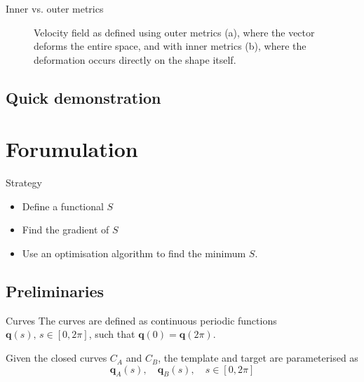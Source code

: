 \documentclass{beamer}
\newcommand{\vect}[1]{\ensuremath{\mathbf{#1}}}
\begin{document}
\begin{frame}{Inner vs. outer metrics}
\begin{figure}[h!]
  \centering
  \caption{Velocity field as defined using outer metrics
    (a), where the vector deforms the entire space, and with inner metrics (b), where the
    deformation occurs directly on the shape itself.}
  \label{fig:metrics}
\end{figure}

\end{frame}

\subsection*{Quick demonstration}
\begin{frame}
\begin{figure}[h!]
  \centering
  \label{fig:vectors}
\end{figure}

\end{frame}


\begin{frame}
 \begin{center}
 \end{center}
\end{frame}

\section{Forumulation}

\begin{frame}{Strategy}
  \begin{itemize}
  \item Define a functional $S$
  \item Find the gradient of $S$
  \item Use an optimisation algorithm to find the minimum $S$.
  \end{itemize}
\end{frame}

\subsection{Preliminaries}
\begin{frame}{Curves}
The curves are defined as  continuous periodic functions  $\vect q(s),\, s \in [0,2\pi]$, 
such that $\vect q(0) = \vect q(2\pi)$.
\vspace{5mm}

Given the closed curves $C_{A}$ and $C_B$, the template and target are parameterised  as
\begin{equation}
  \label{eq:qAqB}
  \vect q_{A}(s),\quad \vect q_{B}(s),\quad s \in [0,2\pi]
\end{equation}
\end{frame}
\end{document}
